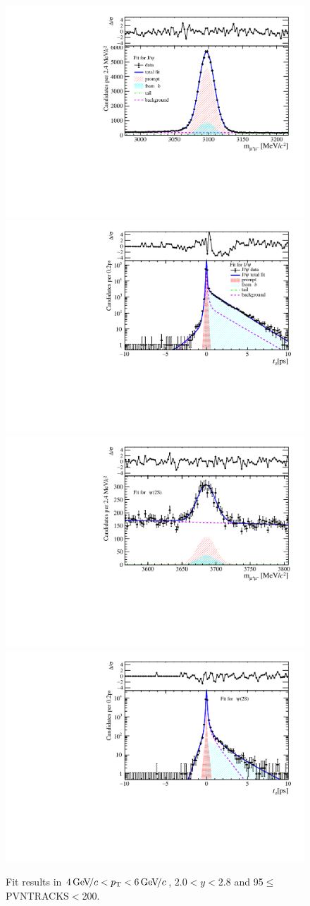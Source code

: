 \begin{figure}[H]
\begin{center}
\includegraphics[width=0.47\linewidth]{pdf/Jpsi/drawmass/n5y1pt3.pdf}
\includegraphics[width=0.47\linewidth]{pdf/Jpsi/2DFit/n5y1pt3.pdf}
\vspace*{-0.5cm}
\includegraphics[width=0.47\linewidth]{pdf/Psi2S/drawmass/n5y1pt3.pdf}
\includegraphics[width=0.47\linewidth]{pdf/Psi2S/2DFit/n5y1pt3.pdf}
\vspace*{-0.5cm}
\end{center}
\caption{Fit results in $4\text{\,Ge\kern -0.1em V\!/}c<p_{\mathrm{T}}<6\text{\,Ge\kern -0.1em V\!/}c$, $2.0<y<2.8$ and 95$\leq$PVNTRACKS$<$200.}
\label{Fitn5y1pt3}
\end{figure}
